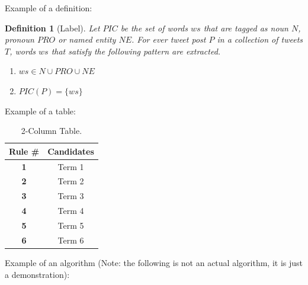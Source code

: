 \documentclass[12pt]{article}  %
\newtheorem{definition}{Definition}
\theoremstyle{plain}
\begin{document}
Example of a definition:
\begin{definition}[Label]
Let $PIC$ be the set of words $ws$ that are tagged as noun $N$, pronoun $PRO$ or named entity $NE$. For ever tweet post $P$ in a collection of tweets $T$, words $ws$ that satisfy the following pattern are extracted.
\begin{enumerate}
\item $ws \in N \cup PRO \cup NE$
\item $PIC(P) = \{ws\}$
\end{enumerate}
\label{def:pos_interest}
\end{definition}

Example of a table:

\begin{table}[ht!]
\centering
\begin{tabular}{|c|c|}
  \hline
  \textbf{Rule \#}& \textbf{Candidates} \\
  \hline
  \textbf{1} & Term 1  \\
  \hline
  \textbf{2} & Term 2  \\
  \hline
  \textbf{3} & Term 3  \\
  \hline  
  \textbf{4} & Term 4  \\
  \hline  
  \textbf{5} & Term 5  \\
  \hline  
  \textbf{6} &Term 6  \\
  \hline
\end{tabular}
\newline
\caption{2-Column Table.}
\label{table:concept_candidates_example}
\end{table}

Example of an algorithm (Note: the following is not an actual algorithm, it is just a demonstration):

\begin{algorithm}
\label{algo:interest_candidate_algorithm}
\caption{Algorithm Label}

\newcommand\sForAll[4]{ \ForAll{#1}#2#3#4\EndFor} %
\newcommand\sIf[2]{ \If{#1}#2\EndIf}  
\renewcommand{\algorithmicforall}{\textbf{for Each}}

\end{algorithm}
\end{document}
